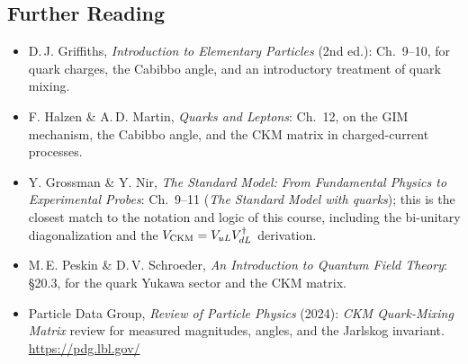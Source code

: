 \begin{furtherreading}
\subsection*{Further Reading}

\begin{itemize}
  \item D.\,J. Griffiths, \textit{Introduction to Elementary Particles}
        (2nd ed.): Ch.~9--10, for quark charges, the Cabibbo angle, and
        an introductory treatment of quark mixing.
  \item F. Halzen \& A.\,D. Martin, \textit{Quarks and Leptons}:
        Ch.~12, on the GIM mechanism, the Cabibbo angle, and the CKM
        matrix in charged-current processes.
  \item Y. Grossman \& Y. Nir, \textit{The Standard Model: From
        Fundamental Physics to Experimental Probes}: Ch.~9--11
        (\textit{The Standard Model with quarks}); this is the closest
        match to the notation and logic of this course, including the
        bi-unitary diagonalization and the $V_{\rm CKM}=V_{uL}V_{dL}^\dagger$
        derivation.
  \item M.\,E. Peskin \& D.\,V. Schroeder, \textit{An Introduction to
        Quantum Field Theory}: \S20.3, for the quark Yukawa sector and
        the CKM matrix.
  \item Particle Data Group, \textit{Review of Particle Physics} (2024):
        \textit{CKM Quark-Mixing Matrix} review for measured magnitudes,
        angles, and the Jarlskog invariant. \url{https://pdg.lbl.gov/}
\end{itemize}
\end{furtherreading}
